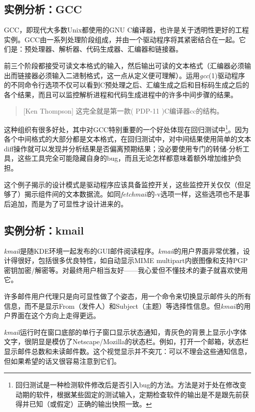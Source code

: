 \documentclass[12pt,oneside]{book}
\begin{document}
\begin{common-format}
\subsection{实例分析：GCC}
GCC，即现代大多数Unix都使用的GNU C编译器，也许是关于透明性更好的工程实例。GCC由一系列处理阶段组成，并由一个驱动程序将其紧密结合在一起。它们是：预处理器、解析器、代码生成器、汇编器和链接器。

前三个阶段都接受可读文本格式的输入，然后输出可读的文本格式（汇编器必须输出而链接器必须输入二进制格式，这一点从定义便可理解）。运用\textit{gcc}(1)驱动程序的不同命令行选项不仅可以看到C预处理之后、汇编生成之后和目标码生成之后的各个结果，而且可以监控解析进程和代码生成进程中的许多中间步骤的结果。
\begin{quote}[Ken Thompson]
这完全就是第一款( PDP-11 )C编译器cc的结构。
\end{quote}

这种组织有很多好处，其中对GCC特别重要的一个好处体现在回归测试中\footnote{回归测试是一种检测软件修改后是否引入bug的方法。方法是对于处在修改变动期的软件，根据某些固定的测试输入，定期检查软件的输出是不是跟先前获得并已知（或假定）正确的输出快照一致。}。因为各个中间格式的大部分都是文本格式，在回归测试中，对中间结果使用简单的文本diff操作就可以发现并分析结果是否偏离预期结果；没必要使用专门的转储-分析工具，这些工具完全可能隐藏自身的bug，而且无论怎样都意味着额外增加维护负担。

这个例子揭示的设计模式是驱动程序应该具备监控开关，这些监控开关仅仅（但足够了）揭示组件间的文本数据流。如同\textit{fetchmail}的-v选项一样，这些选项也不是事后追加，而是为了可显性才设计进来的。


\subsection{实例分析：kmail}
\textit{kmail}是随KDE环境一起发布的GUI邮件阅读程序。\textit{kmail}的用户界面非常优雅，设计得很好，包括很多优良特性，如自动显示MIME multipart内嵌图像和支持PGP密钥加密/解密等。对最终用户相当友好——我心爱但不懂技术的妻子就喜欢使用它。

许多邮件用户代理只是向可显性做了个姿态，用一个命令来切换显示邮件头的所有信息，而不是显示From（发件人）和Subject（主题）等选择性信息。但\textit{kmail}的用户界面在这个方向上走得更远。

\textit{kmail}运行时在窗口底部的单行子窗口显示状态通知，青灰色的背景上显示小字体文字，很阴显是模仿了Netscape/Mozilla的状态栏。例如，打开一个邮箱，状态栏显示邮件总数和未读邮件数。这个视觉显示并不突兀：可以不理会这些通知信息，但如果希望的话又很容易注意到它们。


\end{common-format}
\end{document}
